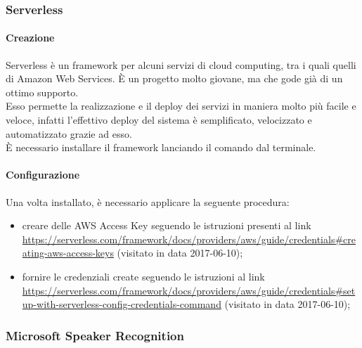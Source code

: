 \subsubsection{Serverless}\label{amazon}
\paragraph{Creazione}
Serverless è un framework per alcuni servizi di cloud computing, tra i quali quelli di Amazon Web Services. È un progetto molto giovane, ma che gode già di un ottimo supporto.\\
Esso permette la realizzazione e il deploy dei servizi in maniera molto più facile e veloce, infatti l'effettivo deploy del sistema è semplificato, velocizzato e automatizzato grazie ad esso. \\
È necessario installare il framework lanciando il comando  dal terminale.
\paragraph{Configurazione}
Una volta installato, è necessario applicare la seguente procedura:
\begin{itemize}
	\item creare delle AWS Access Key seguendo le istruzioni presenti al link \url{https://serverless.com/framework/docs/providers/aws/guide/credentials#creating-aws-access-keys} (visitato in data 2017-06-10);
	\item fornire le credenziali create seguendo le istruzioni al link \url{https://serverless.com/framework/docs/providers/aws/guide/credentials#setup-with-serverless-config-credentials-command} (visitato in data 2017-06-10);
\end{itemize}

\subsubsection{Microsoft Speaker Recognition}\label{speakerRec}
